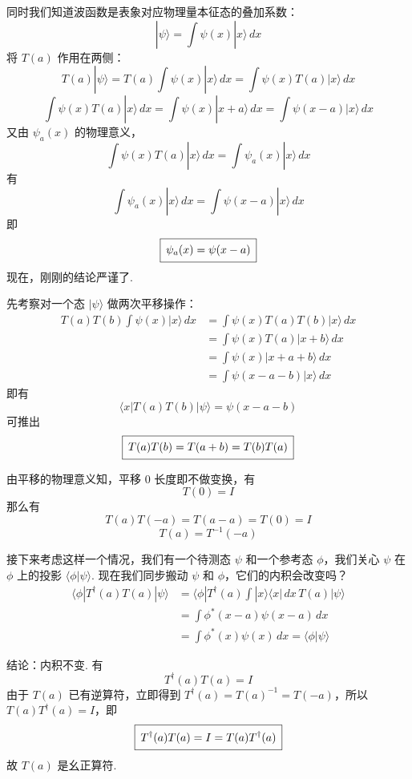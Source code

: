 同时我们知道波函数是表象对应物理量本征态的叠加系数：
\[
|\psi\rangle=\int\psi(x)|x\rangle\,dx
\]
将 \(T(a)\) 作用在两侧：
\[
T(a)|\psi\rangle=T(a)\int\psi(x)|x\rangle\,dx
=\int\psi(x)T(a)|x\rangle\,dx
\]
\[
\int\psi(x)T(a)|x\rangle\,dx
=\int\psi(x)|x+a\rangle\,dx
=\int\psi(x-a)|x\rangle\,dx
\]
又由 \(\psi_a(x)\) 的物理意义，
\[
\int\psi(x)T(a)|x\rangle\,dx=\int\psi_a(x)|x\rangle\,dx
\]
有
\[
\int\psi_a(x)|x\rangle\,dx=\int\psi(x-a)|x\rangle\,dx
\]
即
\[
\resultbox{\psi_a(x)=\psi(x-a)}
\]
现在，刚刚的结论严谨了.

\label{pondering:properties}

先考察对一个态 \(|\psi\rangle\) 做两次平移操作：
\[
\begin{aligned}
T(a)T(b)\int\psi(x)|x\rangle\,dx
&=\int\psi(x)T(a)T(b)|x\rangle\,dx\\
&=\int\psi(x)T(a)|x+b\rangle\,dx\\
&=\int\psi(x)|x+a+b\rangle\,dx\\
&=\int\psi(x-a-b)|x\rangle\,dx
\end{aligned}
\]
即有
\[
\langle x|T(a)T(b)|\psi\rangle=\psi(x-a-b)
\]
可推出
\[
\resultbox{T(a)T(b)=T(a+b)=T(b)T(a)}
\]

由平移的物理意义知，平移 \(0\) 长度即不做变换，有
\[
T(0)=I
\]
那么有
\[
T(a)T(-a)=T(a-a)=T(0)=I
\]
\[
T(a)=T^{-1}(-a)
\]

接下来考虑这样一个情况，我们有一个待测态 \(\psi\) 和一个参考态 \(\phi\)，我们关心 \(\psi\) 在 \(\phi\) 上的投影 \(\langle\phi|\psi\rangle\). 现在我们同步搬动 \(\psi\) 和 \(\phi\)，它们的内积会改变吗？
\[
\begin{aligned}
\langle\phi|T^\dagger(a)T(a)|\psi\rangle
&=\langle\phi|T^\dagger(a)\int|x\rangle\langle x|\,dx\,T(a)|\psi\rangle\\ &=\int\phi^*(x-a)\psi(x-a)\,dx\\
&=\int\phi^*(x)\psi(x)\,dx=\langle\phi|\psi\rangle
\end{aligned}
\]

结论：内积不变. 有
\[
T^\dagger(a)T(a)=I
\]
由于 \(T(a)\) 已有逆算符，立即得到 \(T^\dagger(a)=T(a)^{-1}=T(-a)\)，所以 \(T(a)T^\dagger(a)=I\)，即
\[
\resultbox{T^\dagger(a)T(a)=I=T(a)T^\dagger(a)}
\]
故 \(T(a)\) 是幺正算符.

